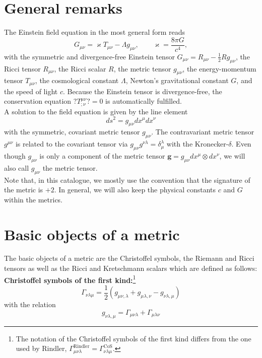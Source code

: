 \documentclass[10pt,twoside,notitlepage,a4paper,fleqn,openbib]{report}
\begin{document}
\section{General remarks}
\setcounter{equation}{0}
The Einstein field equation in the most general form reads\cite{mtw}
\begin{equation}
  \label{eq:EinsteinFieldEquations}
  G_{\mu\nu} = \varkappa T_{\mu\nu}-\Lambda g_{\mu\nu},\qquad \varkappa = \frac{8\pi G}{c^4},
\end{equation}
with the symmetric and divergence-free Einstein tensor $G_{\mu\nu}=R_{\mu\nu}-\frac{1}{2}Rg_{\mu\nu}$, the Ricci tensor $R_{\mu\nu}$, the Ricci scalar $R$, the metric tensor $g_{\mu\nu}$, the energy-momentum tensor $T_{\mu\nu}$, the cosmological constant $\Lambda$, Newton's gravitational constant $G$, and the speed of light $c$. Because the Einstein tensor is divergence-free, the conservation equation $?T^{\mu\nu}_{;\nu}?=0$ is automatically fulfilled.\\[0.5em]
A solution to the field equation is given by the line element
\begin{equation}
 ds^2 = g_{\mu\nu}dx^{\mu}dx^{\nu}
\end{equation}
with the symmetric, covariant metric tensor $g_{\mu\nu}$. The contravariant metric tensor $g^{\mu\nu}$ is related to the covariant tensor via $g_{\mu\nu}g^{\nu\lambda}=\delta_{\mu}^{\lambda}$ with the Kronecker-$\delta$. Even though $g_{\mu\nu}$ is only a component of the metric tensor $\mathbf{g}=g_{\mu\nu}dx^{\mu}\otimes dx^{\nu}$, we will also call $g_{\mu\nu}$ the metric tensor.\\[0.5em]
Note that, in this catalogue, we mostly use the convention that the signature of the metric is $+2$. In general, we will also keep the physical constants $c$ and $G$ within the metrics.

\section{Basic objects of a metric}
\setcounter{equation}{0}
The basic objects of a metric are the Christoffel symbols, the Riemann and Ricci tensors as well as the Ricci and Kretschmann scalars which are defined as follows:\\[0.5em]
{\bf Christoffel symbols of the first kind:}\footnote{The notation of the Christoffel symbols of the first kind differs from the one used by Rindler\cite{rindler}, $\Gamma_{\mu\nu\lambda}^{\text{Rindler}}=\Gamma_{\nu\lambda\mu}^{\text{CoS}}$.}
\begin{equation}
  \label{eq:ChristoffelSymbolsFK}
  \Gamma_{\nu\lambda\mu} = \frac{1}{2}\left(g_{\mu\nu,\lambda}+g_{\mu\lambda,\nu}-g_{\nu\lambda,\mu}\right)
\end{equation}
with the relation
\begin{equation}
  g_{\nu\lambda,\mu} = \Gamma_{\mu\nu\lambda}+\Gamma_{\mu\lambda\nu}
\end{equation}
\end{document}
